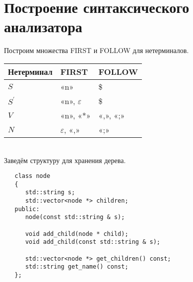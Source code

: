 \section{Построение синтаксического анализатора}

Построим множества FIRST и FOLLOW для нетерминалов.

\begin{tabular}{| l | l | l |}
    \hline
    \textbf{Нетерминал} & \textbf{FIRST} & \textbf{FOLLOW} \\
    \hline
    $S$ & «n» & \$ \\
    \hline
    $S^{'}$ & «n», $\varepsilon$ & \$ \\
    \hline
    $V$ & «n», «*» & «,», «;» \\
    \hline
    $N$ & $\varepsilon$, «,» & «;» \\
    \hline
\end{tabular}
\\
Заведём структуру для хранения дерева.

\begin{verbatim}
   class node
   {
      std::string s;
      std::vector<node *> children;
   public:
      node(const std::string & s);

      void add_child(node * child);
      void add_child(const std::string & s);
      
      std::vector<node *> get_children() const;
      std::string get_name() const;
   };
\end{verbatim}

